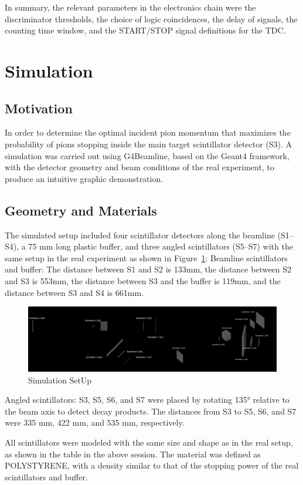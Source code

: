 \documentclass[11pt,a4paper]{article}
\begin{document}
In summary, the relevant parameters in the electronics chain were the discriminator thresholds, the choice of logic coincidences, the delay of signals, the counting time window, and the START/STOP signal definitions for the TDC.

\section{Simulation}


\subsection{Motivation}
In order to determine the optimal incident pion momentum that maximizes the probability of pions stopping inside the main target scintillator detector (S3).
A simulation was carried out using G4Beamline, based on the Geant4 framework, with the detector geometry and beam conditions of the real experiment, to produce an intuitive graphic demonstration. 

\subsection{Geometry and Materials}
The simulated setup included four scintillator detectors along the beamline (S1–S4), a 75 mm long plastic buffer, and three angled scintillators (S5–S7) with the same setup in the real experiment as shown in Figure~\ref{fig:1setup}:
Beamline scintillators and buffer: The distance between S1 and S2 is 133mm, the distance between S2 and S3 is 553mm, the distance between S3 and the buffer is 119mm, and the distance between S3 and S4 is 661mm.
\begin{figure}[h]
\centering
\includegraphics[width=0.70\linewidth]{1setup.JPEG}
\caption{Simulation SetUp}
\label{fig:1setup}
\end{figure}

Angled scintillators: S3, S5, S6, and S7 were placed by rotating 135° relative to the beam axis to detect decay products. The distances from S3 to S5, S6, and S7 were 335 mm, 422 mm, and 535 mm, respectively.

All scintillators were modeled with the same size and shape as in the real setup, as shown in the table in the above session. The material was defined as POLYSTYRENE, with a density similar to that of the stopping power of the real scintillators and buffer.
\end{document}
